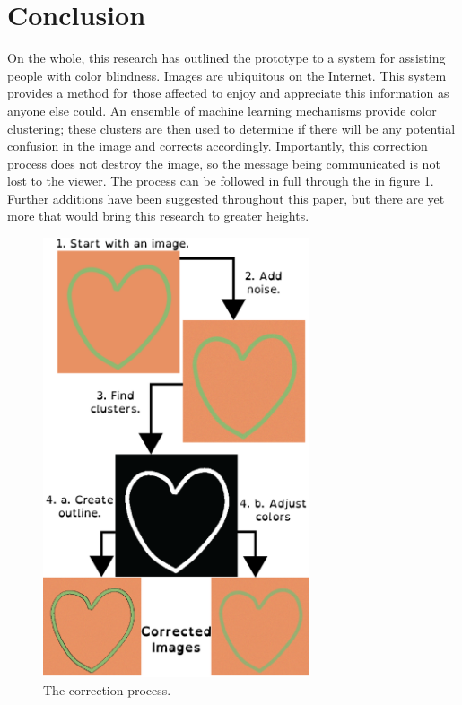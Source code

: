 \documentclass[12pt]{article}
\begin{document}
\section{Conclusion}
On the whole, this research has outlined the prototype to a system for assisting people with color blindness. Images are ubiquitous on the Internet. This system provides a method for those affected to enjoy and appreciate this information as anyone else could. An ensemble of machine learning mechanisms provide color clustering; these clusters are then used to determine if there will be any potential confusion in the image and corrects accordingly. Importantly, this correction process does not destroy the image, so the message being communicated is not lost to the viewer. The process can be followed in full through the in figure \ref{fig:process}. Further additions have been suggested throughout this paper, but there are yet more that would bring this research to greater heights.

\begin{figure}[H]
	\centering
	\includegraphics[width=0.7\textwidth]{img/process.png}
	\caption{The correction process.}
	\label{fig:process}
\end{figure}
\end{document}
